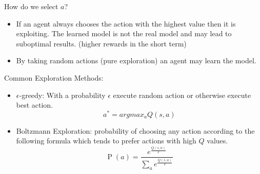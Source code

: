 \documentclass[12pt]{article}
\begin{document}
            How do we select $a$?
            \begin{itemize}
                \item If an agent always chooses the action with the highest value then it is exploiting. The learned model is not
                the real model and may lead to suboptimal results. (higher rewards in the short term)
                \item By taking random actions (pure exploration) an agent may learn the model. 
            \end{itemize}

            Common Exploration Methods:
            \begin{itemize}
                \item $\epsilon$-greedy: With a probability $\epsilon$ execute random action or otherwise execute best action.
                $$ a^* = argmax_a Q(s,a) $$
                \item Boltzmann Exploration: probability of choosing any action according to the following formula which
                tends to prefer actions with high $Q$ values.
                $$ \operatorname{P}(a)=\frac{e^{\frac{Q(s, a)}{T}}}{\sum_{a} e^{\frac{Q(s, a)}{T}}} $$ 
            \end{itemize}
\printindex
\end{document}
